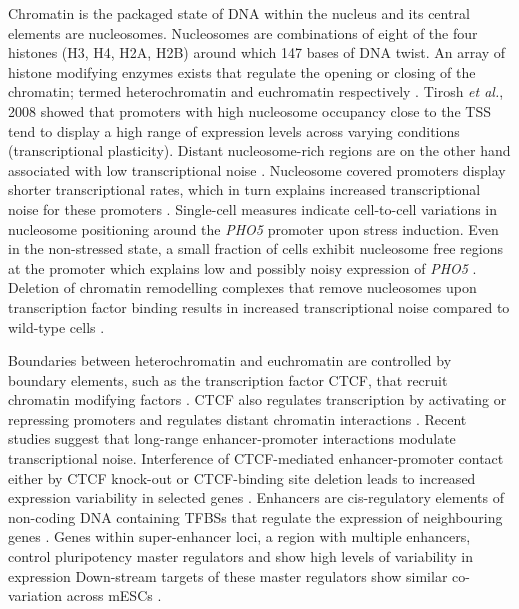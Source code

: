 Chromatin is the packaged state of DNA within the nucleus and its central elements are nucleosomes. Nucleosomes are combinations of eight of the four histones (H3, H4, H2A, H2B) around which 147 bases of DNA twist. An array of histone modifying enzymes exists that regulate the opening or closing of the chromatin; termed heterochromatin and euchromatin respectively \citep{Kouzarides2007}. Tirosh \textit{et al.}, 2008 showed that promoters with high nucleosome occupancy close to the TSS tend to display a high range of expression levels across varying conditions (transcriptional plasticity). Distant nucleosome-rich regions are on the other hand associated with low transcriptional noise \citep{Tirosh2008}. Nucleosome covered promoters display shorter transcriptional rates, which in turn explains increased transcriptional noise for these promoters \cite{Dey2015}. Single-cell measures indicate cell-to-cell variations in nucleosome positioning around the \textit{PHO5} promoter upon stress induction. Even in the non-stressed state, a small fraction of cells exhibit nucleosome free regions at the promoter which explains low and possibly noisy expression of \textit{PHO5} \citep{Small2014}. Deletion of chromatin remodelling complexes that remove nucleosomes upon transcription factor binding results in increased transcriptional noise compared to wild-type cells \citep{Raser2004}. 

\newpage

Boundaries between heterochromatin and euchromatin are controlled by boundary elements, such as the transcription factor \Gls{CTCF}, that recruit chromatin modifying factors \citep{Kouzarides2007}. CTCF also regulates transcription by activating or repressing promoters and regulates distant chromatin interactions \citep{Kim2015a}. Recent studies suggest that long-range enhancer-promoter interactions modulate transcriptional noise. Interference of CTCF-mediated enhancer-promoter contact either by CTCF knock-out or CTCF-binding site deletion leads to increased expression variability in selected genes \citep{Ren2017}. Enhancers are cis-regulatory elements of non-coding DNA containing TFBSs that regulate the expression of neighbouring genes \citep{Blackwood1998}. Genes within super-enhancer loci, a region with multiple enhancers, control pluripotency master regulators and show high levels of variability in expression Down-stream targets of these master regulators show similar co-variation across mESCs \citep{Faure2017}.

